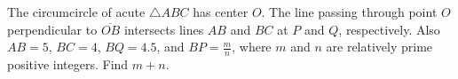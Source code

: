 The circumcircle of acute $\triangle ABC$ has center $O$. The line passing through point $O$ perpendicular to $\overline{OB}$ intersects lines $AB$ and $BC$ at $P$ and $Q$, respectively. Also $AB=5$, $BC=4$, $BQ=4.5$, and $BP=\frac{m}{n}$, where $m$ and $n$ are relatively prime positive integers. Find $m+n$.